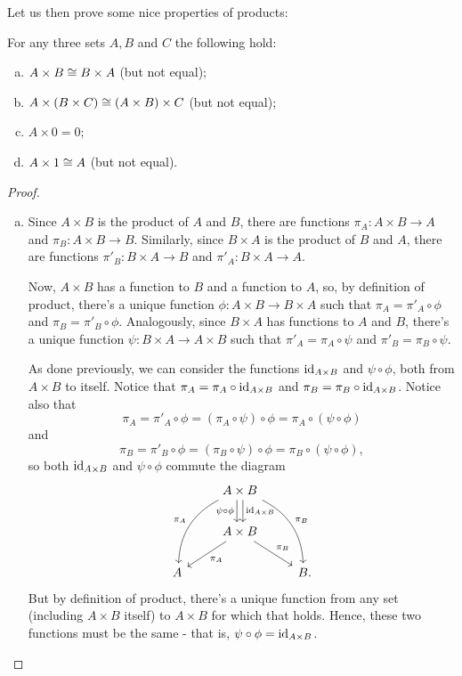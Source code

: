 Let us then prove some nice properties of products:

\begin{lemma}\label{lem:product properties}
		For any three sets $A,B$ and $C$ the following hold:
	\begin{enumerate}[(a)]
		\item $A\times B\cong B\times A$ (but not equal);
		\item $A\times(B\times C)\cong (A\times B)\times C$ (but not equal);
		\item $A\times 0=0$;
		\item $A\times 1\cong A$ (but not equal).
	\end{enumerate}
\end{lemma}
\begin{proof}
	\begin{enumerate}[(a)]
		\item Since $A\times B$ is the product of $A$ and $B$, there are functions $\pi_A:A\times B\to A$ and $\pi_B:A\times B\to B$. Similarly, since $B\times A$ is the product of $B$ and $A$, there are functions $\pi'_B:B\times A\to B$ and $\pi'_A:B\times A\to A$.
		
		Now, $A\times B$ has a function to $B$ and a function to $A$, so, by definition of product, there's a unique function $\phi:A\times B\to B\times A$ such that $\pi_A=\pi'_A\circ\phi$ and $\pi_B=\pi'_B\circ\phi$. Analogously, since $B\times A$ has functions to $A$ and $B$, there's a unique function $\psi:B\times A\to A\times B$ such that $\pi'_A=\pi_A\circ\psi$ and $\pi'_B=\pi_B\circ \psi$.
		
		As done previously, we can consider the functions ${\rm id}_{A\times B}$ and $\psi\circ\phi$, both from $A\times B$ to itself. Notice that $\pi_A=\pi_A\circ{\rm id}_{A\times B}$ and $\pi_B=\pi_B\circ{\rm id}_{A\times B}$. Notice also that $$\pi_A=\pi'_A\circ\phi=(\pi_A\circ\psi)\circ\phi=\pi_A\circ(\psi\circ\phi)$$and$$\pi_B=\pi'_B\circ\phi=(\pi_B\circ\psi)\circ\phi=\pi_B\circ(\psi\circ\phi),$$so both ${\rm id}_{A\times B}$ and $\psi\circ\phi$ commute the diagram
		\[\begin{tikzcd}
		& A\times B \arrow[d, "\id_{A\times B}",shift left] \arrow[d, "\psi\circ\phi"',shift right] \arrow[ldd, "\pi_A"', bend right] \arrow[rdd, "\pi_B", bend left] &   \\
		& A\times B \arrow[ld, "\pi_A"] \arrow[rd, "\pi_B"]                                                                                    &   \\
		A &                                                                                                                                      & B.
		\end{tikzcd}\] But by definition of product, there's a unique function from any set (including $A\times B$ itself) to $A\times B$ for which that holds. Hence, these two functions must be the same - that is, $\psi\circ\phi={\rm id}_{A\times B}$.
		

\end{enumerate}
\end{proof}
